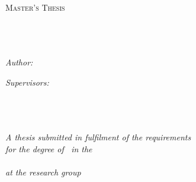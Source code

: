 \documentclass[11pt, oneside]{Thesis} %
\begin{document}
\begin{titlepage}
\begin{center}

\textsc{\LARGE \univname}\\[1.5cm] %
\textsc{\Large Master's Thesis}\\[0.5cm] %

\HRule \\[0.4cm] %
{\huge \bfseries \ttitle}\\[0.4cm] %
\HRule \\[1.5cm] %
 
\begin{minipage}{0.4\textwidth}
\begin{flushleft} \large
\emph{Author:}\\
\href{https://github.com/sheyma}{\authornames} %
\end{flushleft}
\end{minipage}
\begin{minipage}{0.4\textwidth}
\begin{flushright} \large
\emph{Supervisors:} \\
\href{http://kobi.nat.uni-magdeburg.de/user/29 }{\supnamea}\\ %
\href{https://www.itp.tu-berlin.de/bccn-nachwuchsgruppe_nonlinear_dynamics_and_control_in_neuroscience/hoevel/mitglieder/phoevel/}{\supnameb} \\
\href{https://www.itp.tu-berlin.de/bccn-nachwuchsgruppe_nonlinear_dynamics_and_control_in_neuroscience/hoevel/mitglieder/promovierte_mitarbeiterinnen/dr_vesna_vuksanovic/}{\supnamec} %
\end{flushright}
\end{minipage}\\[3cm]
 
\large \textit{A thesis submitted in fulfilment of the requirements\\ for the degree of \degreename \, in the}\\[0.3cm] %
\deptname\\[0.3cm] %
\large \textit{at the research group}\\[0.3cm]
\groupname\\[0.3cm]  
 

\end{center}
\end{titlepage}
\end{document}
